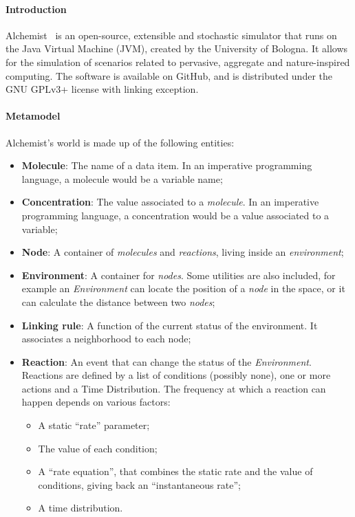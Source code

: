 \paragraph{Introduction} Alchemist~\cite{alchemist} is an open-source, extensible and stochastic simulator that runs on the Java Virtual Machine (JVM), created by the University of Bologna. It allows for the simulation of scenarios related to pervasive, aggregate and nature-inspired computing. The software is available on GitHub, and is distributed under the GNU GPLv3+ license with linking exception.

\paragraph{Metamodel} Alchemist's world is made up of the following entities:
\begin{itemize}
	\item \textbf{Molecule}: The name of a data item. In an imperative programming language, a molecule would be a variable name;
	\item \textbf{Concentration}: The value associated to a \textit{molecule}. In an imperative programming language, a concentration would be a value associated to a variable;
	\item \textbf{Node}: A container of \textit{molecules} and \textit{reactions}, living inside an \textit{environment};
	\item \textbf{Environment}: A container for \textit{nodes}. Some utilities are also included, for example an \textit{Environment} can locate the position of a \textit{node} in the space, or it can calculate the distance between two \textit{nodes};
	\item \textbf{Linking rule}: A function of the current status of the environment. It associates a neighborhood to each node;
	\item \textbf{Reaction}: An event that can change the status of the \textit{Environment}. Reactions are defined by a list of conditions (possibly none), one or more actions and  a Time Distribution. The frequency at which a reaction can happen depends on various factors:
	\begin{itemize}
		\item A static “rate” parameter;
		\item The value of each condition;
		\item A “rate equation”, that combines the static rate and the value of conditions, giving back an “instantaneous rate”;
		\item A time distribution.

\end{itemize}
\end{itemize}
